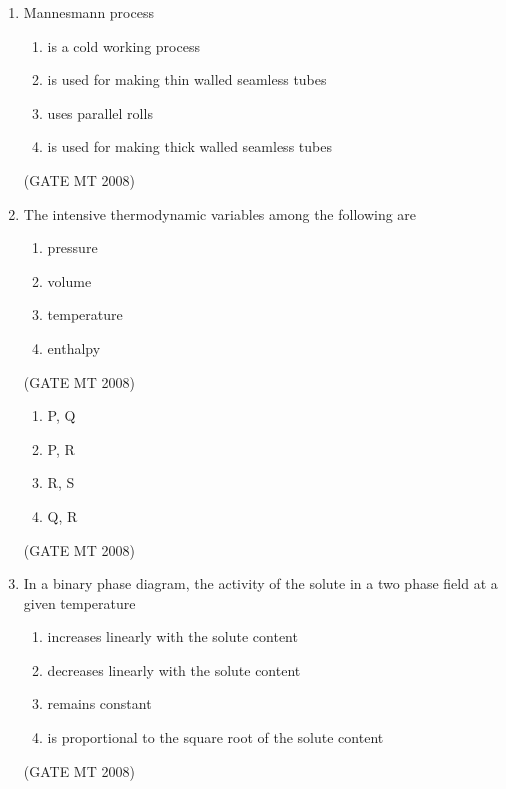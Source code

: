 \documentclass[11pt, letterpaper]{article}
\theoremstyle{remark}
\begin{document}
\begin{enumerate}[label=Q.\arabic*]
\item Mannesmann process
\vspace{-0.9em}
\begin{multicols}{1}
 \begin{enumerate}[label=(\MakeUppercase{\alph*})]
  \item is a cold working process
  \item is used for making thin walled seamless tubes 
  \item uses parallel rolls
  \item is used for making thick walled seamless tubes
 \end{enumerate}
\end{multicols}
\vspace{-5mm}
\hfill(GATE MT 2008)

\item The intensive thermodynamic variables among the following are
\vspace{-0.9em}
\begin{multicols}{4}
 \begin{enumerate}[label=(\MakeUppercase{\alph*}), start= 16]
  \item pressure
  \item volume 
  \item temperature
  \item enthalpy
 \end{enumerate}
\end{multicols}
\vspace{-5mm}
\hfill(GATE MT 2008)

\vspace{-0.9em}
\begin{multicols}{4}
 \begin{enumerate}[label=(\MakeUppercase{\alph*})]
  \item P, Q
  \item P, R 
  \item R, S
  \item Q, R
 \end{enumerate}
\end{multicols}
\vspace{-5mm}
\hfill(GATE MT 2008)

\item In a binary phase diagram, the activity of the solute in a two phase field at a given temperature
\vspace{-0.9em}
\begin{multicols}{1}
 \begin{enumerate}[label=(\MakeUppercase{\alph*})]
  \item increases linearly with the solute content
  \item decreases linearly with the solute content
  \item remains constant
  \item is proportional to the square root of the solute content
 \end{enumerate}
\end{multicols}
\vspace{-5mm}
\hfill(GATE MT 2008)


\end{enumerate}
\end{document}
